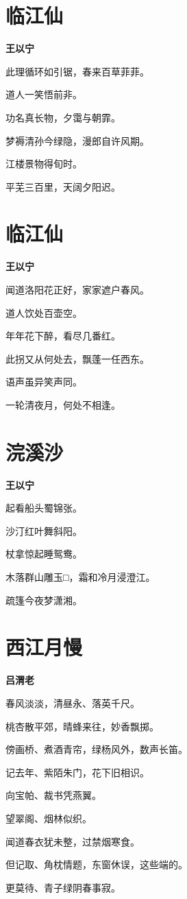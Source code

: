 \documentclass[12pt,a4paper]{ctexbook}
\begin{document}
\section{临江仙}
\textbf{王以宁}\par\vspace{0.5em}
此理循环如引锯，春来百草菲菲。\par
道人一笑悟前非。\par
功名真长物，夕霭与朝霏。\par
梦褥清孙今绿隐，漫郎自许风期。\par
江楼景物得旬时。\par
平芜三百里，天阔夕阳迟。\par

\section{临江仙}
\textbf{王以宁}\par\vspace{0.5em}
闻道洛阳花正好，家家遮户春风。\par
道人饮处百壶空。\par
年年花下醉，看尽几番红。\par
此拐又从何处去，飘蓬一任西东。\par
语声虽异笑声同。\par
一轮清夜月，何处不相逢。\par

\section{浣溪沙}
\textbf{王以宁}\par\vspace{0.5em}
起看船头蜀锦张。\par
沙汀红叶舞斜阳。\par
杖拿惊起睡鸳鸯。\par
木落群山雕玉□，霜和冷月浸澄江。\par
疏篷今夜梦潇湘。\par

\section{西江月慢}
\textbf{吕渭老}\par\vspace{0.5em}
春风淡淡，清昼永、落英千尺。\par
桃杏散平郊，晴蜂来往，妙香飘掷。\par
傍画桥、煮酒青帘，绿杨风外，数声长笛。\par
记去年、紫陌朱门，花下旧相识。\par
向宝帕、裁书凭燕翼。\par
望翠阁、烟林似织。\par
闻道春衣犹未整，过禁烟寒食。\par
但记取、角枕情题，东窗休误，这些端的。\par
更莫待、青子绿阴春事寂。\par
\end{document}
